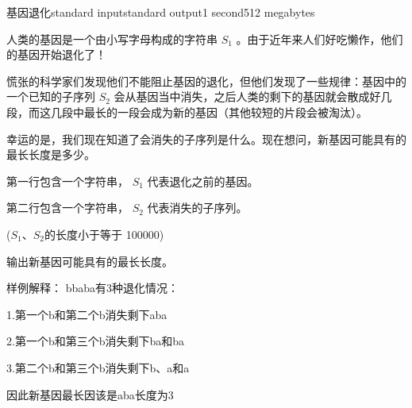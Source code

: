 \begin{problem}{基因退化}{standard input}{standard output}{1 second}{512 megabytes}

人类的基因是一个由小写字母构成的字符串 $ S_1 $ 。由于近年来人们好吃懒作，他们的基因开始退化了！

慌张的科学家们发现他们不能阻止基因的退化，但他们发现了一些规律：基因中的一个已知的子序列 $ S_2 $ 会从基因当中消失，之后人类的剩下的基因就会散成好几段，而这几段中最长的一段会成为新的基因（其他较短的片段会被淘汰）。

幸运的是，我们现在知道了会消失的子序列是什么。现在想问，新基因可能具有的最长长度是多少。

\InputFile
第一行包含一个字符串， $ S_1 $ 代表退化之前的基因。

第二行包含一个字符串， $ S_2 $ 代表消失的子序列。

($ S_1 $、$ S_2 $的长度小于等于 100000)

\OutputFile
输出新基因可能具有的最长长度。

\Example

\begin{example}
%
\end{example}

\Note
样例解释：
bbaba有3种退化情况：

1.第一个b和第二个b消失剩下aba

2.第一个b和第三个b消失剩下ba和ba

3.第二个b和第三个b消失剩下b、a和a

因此新基因最长因该是aba长度为3

\end{problem}

